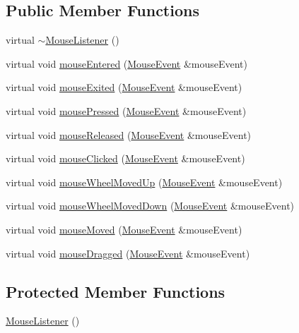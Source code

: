 \subsection*{Public Member Functions}
\begin{DoxyCompactItemize}
\item 
virtual \hyperlink{classgcn_1_1MouseListener_a418107f31e2ba41bceb6f794ef2ce101}{$\sim$\+Mouse\+Listener} ()
\item 
virtual void \hyperlink{classgcn_1_1MouseListener_a5d0fc52c1fd750eb76560fbc27672dac}{mouse\+Entered} (\hyperlink{classgcn_1_1MouseEvent}{Mouse\+Event} \&mouse\+Event)
\item 
virtual void \hyperlink{classgcn_1_1MouseListener_ac84dd820bbcf3bf9268776db69cbf114}{mouse\+Exited} (\hyperlink{classgcn_1_1MouseEvent}{Mouse\+Event} \&mouse\+Event)
\item 
virtual void \hyperlink{classgcn_1_1MouseListener_af81ee6190a48a18585f6e738e381abd3}{mouse\+Pressed} (\hyperlink{classgcn_1_1MouseEvent}{Mouse\+Event} \&mouse\+Event)
\item 
virtual void \hyperlink{classgcn_1_1MouseListener_adf68ed80e1a3c027fbb5d0e575b20fc3}{mouse\+Released} (\hyperlink{classgcn_1_1MouseEvent}{Mouse\+Event} \&mouse\+Event)
\item 
virtual void \hyperlink{classgcn_1_1MouseListener_ae1a2c416d10cc035bd941e99ac49a0f0}{mouse\+Clicked} (\hyperlink{classgcn_1_1MouseEvent}{Mouse\+Event} \&mouse\+Event)
\item 
virtual void \hyperlink{classgcn_1_1MouseListener_ab3cb0eb9b771656461d3e0248127721d}{mouse\+Wheel\+Moved\+Up} (\hyperlink{classgcn_1_1MouseEvent}{Mouse\+Event} \&mouse\+Event)
\item 
virtual void \hyperlink{classgcn_1_1MouseListener_ab177e069d747626bcf228149c4391320}{mouse\+Wheel\+Moved\+Down} (\hyperlink{classgcn_1_1MouseEvent}{Mouse\+Event} \&mouse\+Event)
\item 
virtual void \hyperlink{classgcn_1_1MouseListener_a2d958890972bec9110445b8dffcc87e0}{mouse\+Moved} (\hyperlink{classgcn_1_1MouseEvent}{Mouse\+Event} \&mouse\+Event)
\item 
virtual void \hyperlink{classgcn_1_1MouseListener_a5e2764977dd75e52d116f9ba6311a46b}{mouse\+Dragged} (\hyperlink{classgcn_1_1MouseEvent}{Mouse\+Event} \&mouse\+Event)
\end{DoxyCompactItemize}
\subsection*{Protected Member Functions}
\begin{DoxyCompactItemize}
\item 
\hyperlink{classgcn_1_1MouseListener_aa1898f8c7b93fb208b5e9ce86d6a3fb5}{Mouse\+Listener} ()
\end{DoxyCompactItemize}


